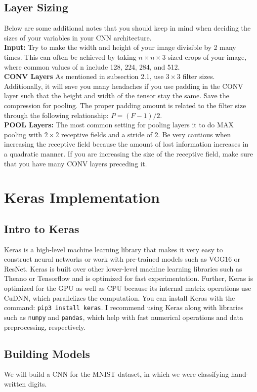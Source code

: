 \documentclass[11pt]{article}
\begin{document}
\subsection{Layer Sizing}
Below are some additional notes that you should keep in mind when deciding the sizes of your variables in your CNN architecture. \\
\textbf{Input: }Try to make the width and height of your image divisible by 2 many times. This can often be achieved by taking $n \times n \times 3$ sized crops of your image, where common values of n include 128, 224, 284, and 512. \\
\textbf{CONV Layers} As mentioned in subsection 2.1, use $3 \times 3$  filter sizes. Additionally, it will save you many headaches if you use padding in the CONV layer such that the height and width of the tensor stay the same. Save the compression for pooling. The proper padding amount is related to the filter size through the following relationship: $P = (F-1)/2$. \\
\textbf{POOL Layers:} The most common setting for pooling layers it to do MAX pooling with $2 \times 2$ receptive fields and a stride of 2. Be very cautious when increasing the receptive field because the amount of lost information increases in a quadratic manner. If you are increasing the size of the receptive field, make sure that you have many CONV layers preceding it. 

\section{Keras Implementation}
\subsection{Intro to Keras}
Keras is a high-level machine learning library that makes it very easy to construct neural networks or work with pre-trained models such as VGG16 or ResNet. Keras is built over other lower-level machine learning libraries such as Theano or Tensorflow and is optimized for fast experimentation. Further, Keras is optimized for the GPU as well as CPU because its internal matrix operations use CuDNN, which parallelizes the computation. You can install Keras with the command: \texttt{pip3 install keras}. I recommend using Keras along with libraries such as \texttt{numpy} and \texttt{pandas}, which help with fast numerical operations and data preprocessing, respectively.

\subsection{Building Models}
We will build a CNN for the MNIST dataset, in which we were classifying hand-written digits.
\end{document}
